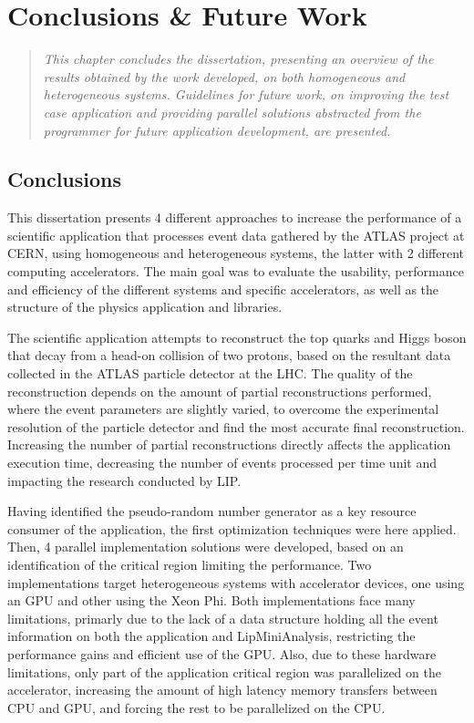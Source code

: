 \chapter{Conclusions \& Future Work}
\label{ConclusionFutureWork}

\begin{quote}
\textit{This chapter concludes the dissertation, presenting an overview of the results obtained by the work developed, on both homogeneous and heterogeneous systems. Guidelines for future work, on improving the test case application and providing parallel solutions abstracted from the programmer for future application development, are presented.}
\end{quote}

\section{Conclusions}
\label{Conclusion}

This dissertation presents 4 different approaches to increase the performance of a scientific application that processes event data gathered by the ATLAS project at CERN, using homogeneous and heterogeneous systems, the latter with 2 different computing accelerators. The main goal was to evaluate the usability, performance and efficiency of the different systems and specific accelerators, as well as the structure of the physics application and libraries.

The scientific application attempts to reconstruct the top quarks and Higgs boson that decay from a head-on collision of two protons, based on the resultant data collected in the ATLAS particle detector at the LHC. The quality of the reconstruction depends on the amount of partial reconstructions performed, where the event parameters are slightly varied, to overcome the experimental resolution of the particle detector and find the most accurate final reconstruction. Increasing the number of partial reconstructions directly affects the application execution time, decreasing the number of events processed per time unit and impacting the research conducted by LIP.

Having identified the pseudo-random number generator as a key resource consumer of the application, the first optimization techniques were here applied. Then, 4 parallel implementation solutions were developed, based on an identification of the critical region limiting the performance. Two implementations target heterogeneous systems with accelerator devices, one using an \nvidia GPU and other using the \intel Xeon Phi. Both implementations face many limitations, primarly due to the lack of a data structure holding all the event information on both the application and LipMiniAnalysis, restricting the performance gains and efficient use of the GPU. Also, due to these hardware limitations, only part of the application critical region was parallelized on the accelerator, increasing the amount of high latency memory transfers between CPU and GPU, and forcing the rest to be parallelized on the CPU.

